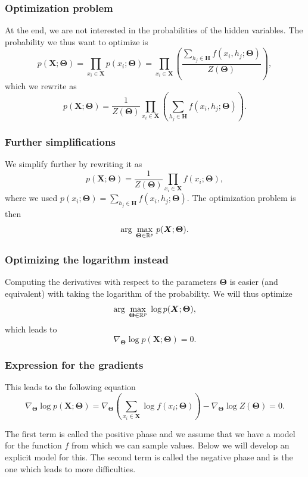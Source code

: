 \documentclass{beamer}
\begin{document}
\begin{frame}
\frametitle{Optimization problem}

At the end, we are not interested in the probabilities of the hidden variables. The probability we thus want to optimize is 
\[
p(\bm{X};\bm{\Theta})=\prod_{x_i\in \bm{X}}p(x_i;\bm{\Theta})=\prod_{x_i\in \bm{X}}\left(\frac{\sum_{h_j\in \bm{H}}f(x_i,h_j;\bm{\Theta})}{Z(\bm{\Theta})}\right),
\]
which we rewrite as
\[
p(\bm{X};\bm{\Theta})=\frac{1}{Z(\bm{\Theta})}\prod_{x_i\in \bm{X}}\left(\sum_{h_j\in \bm{H}}f(x_i,h_j;\bm{\Theta})\right).
\]
\end{frame}

\begin{frame}
\frametitle{Further simplifications}

We simplify further by rewriting it as
\[
p(\bm{X};\bm{\Theta})=\frac{1}{Z(\bm{\Theta})}\prod_{x_i\in \bm{X}}f(x_i;\bm{\Theta}),
\]
where we used $p(x_i;\bm{\Theta}) = \sum_{h_j\in \bm{H}}f(x_i,h_j;\bm{\Theta})$.
The optimization problem is then
\[
{\displaystyle \mathrm{arg} \hspace{0.1cm}\max_{\bm{\bm{\Theta}}\in {\mathbb{R}}^{p}}} \hspace{0.1cm}p(\bm{X};\bm{\Theta}).
\]
\end{frame}

\begin{frame}
\frametitle{Optimizing the logarithm instead}

Computing the derivatives with respect to the parameters $\bm{\Theta}$ is
easier (and equivalent) with taking the logarithm of the
probability. We will thus optimize
\[
{\displaystyle \mathrm{arg} \hspace{0.1cm}\max_{\bm{\bm{\Theta}}\in {\mathbb{R}}^{p}}} \hspace{0.1cm}\log{p(\bm{X};\bm{\Theta})},
\]
which leads to
\[
\nabla_{\bm{\Theta}}\log{p(\bm{X};\bm{\Theta})}=0.
\]
\end{frame}

\begin{frame}
\frametitle{Expression for the gradients}

This leads to the following equation
\[
\nabla_{\bm{\Theta}}\log{p(\bm{X};\bm{\Theta})}=\nabla_{\bm{\Theta}}\left(\sum_{x_i\in \bm{X}}\log{f(x_i;\bm{\Theta})}\right)-\nabla_{\bm{\Theta}}\log{Z(\bm{\Theta})}=0.
\]

The first term is called the positive phase and we assume that we have a model for the function $f$ from which we can sample values. Below we will develop an explicit model for this.
The second term is called the negative phase and is the one which leads to more difficulties.
\end{frame}
\end{document}
